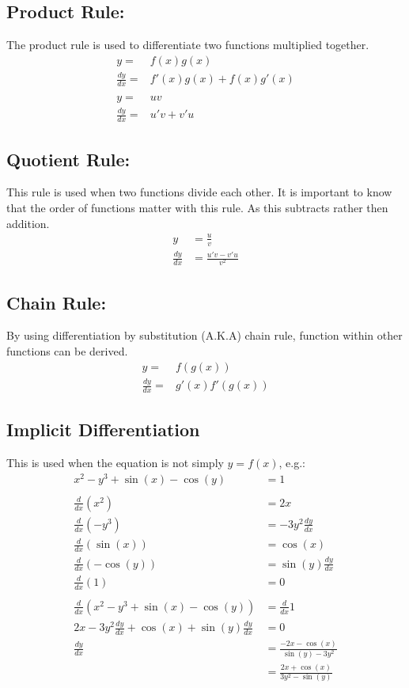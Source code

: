 \documentclass[a5paper]{article}
\begin{document}
	\subsection{Product Rule:}
	The product rule is used to differentiate two functions multiplied together.
	\begin{align*}
		y=&f(x)g(x) \\
		\frac{dy}{dx}=&f'(x)g(x)+f(x)g'(x)\\\\
		y=&uv\\
		\frac{dy}{dx}=&u'v+v'u
	\end{align*}
	\subsection{Quotient Rule:}
	This rule is used when two functions divide each other. It is important to know that the order of functions matter with this rule. As this subtracts rather then addition.
	\begin{align*}
		y&=\frac{u}{v}\\
		\frac{dy}{dx}&=\frac{u'v-v'u}{v^{2}}
	\end{align*}
	\subsection{Chain Rule:}
	By using differentiation by substitution (A.K.A) chain rule, function within other functions can be derived.
	\begin{align*}
		y=&f(g(x))\\
		\frac{dy}{dx}=&g'(x)f'(g(x))
	\end{align*}

	\subsection{Implicit Differentiation}
	This is used when the equation is not simply $y=f(x)$, e.g.:
	\begin{align*}
		x^{2}-y^{3}+\sin{(x)}-\cos{(y)}&=1 \\\\
		\frac{d}{dx}(x^{2})&=2x \\
		\frac{d}{dx}(-y^{3})&=-3y^{2}\frac{dy}{dx}\\
		\frac{d}{dx}(\sin{(x)})&=\cos{(x)}\\
		\frac{d}{dx}(-\cos{(y)})&=\sin{(y)}\frac{dy}{dx}\\
		\frac{d}{dx}(1)&=0\\\\
		\frac{d}{dx}(x^{2}-y^{3}+\sin{(x)}-\cos{(y)})&=\frac{d}{dx}1\\
		2x-3y^{2}\frac{dy}{dx}+\cos{(x)}+\sin{(y)}\frac{dy}{dx}&=0\\
		\frac{dy}{dx}&=\frac{-2x-\cos{(x)}}{\sin{(y)}-3y^{2}}\\
			     &=\frac{2x+\cos{(x)}}{3y^{2}-\sin{(y)}}
	\end{align*}
\end{document}

